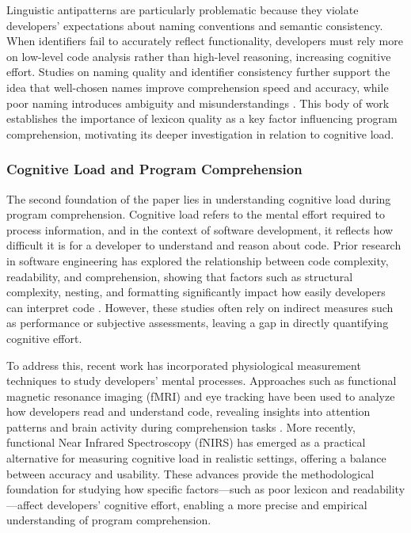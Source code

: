 Linguistic antipatterns are particularly problematic because they violate developers’ expectations about naming conventions and semantic consistency. When identifiers fail to accurately reflect functionality, developers must rely more on low-level code analysis rather than high-level reasoning, increasing cognitive effort. Studies on naming quality and identifier consistency further support the idea that well-chosen names improve comprehension speed and accuracy, while poor naming introduces ambiguity and misunderstandings \cite{Deissenboeck2006}. This body of work establishes the importance of lexicon quality as a key factor influencing program comprehension, motivating its deeper investigation in relation to cognitive load.

\subsubsection{Cognitive Load and Program Comprehension}

The second foundation of the paper lies in understanding cognitive load during program comprehension. Cognitive load refers to the mental effort required to process information, and in the context of software development, it reflects how difficult it is for a developer to understand and reason about code. Prior research in software engineering has explored the relationship between code complexity, readability, and comprehension, showing that factors such as structural complexity, nesting, and formatting significantly impact how easily developers can interpret code \cite{BuseWeimer2010}. However, these studies often rely on indirect measures such as performance or subjective assessments, leaving a gap in directly quantifying cognitive effort.

To address this, recent work has incorporated physiological measurement techniques to study developers' mental processes. Approaches such as functional magnetic resonance imaging (fMRI) and eye tracking have been used to analyze how developers read and understand code, revealing insights into attention patterns and brain activity during comprehension tasks \cite{Siegmund2014,Fritz2014}. More recently, functional Near Infrared Spectroscopy (fNIRS) has emerged as a practical alternative for measuring cognitive load in realistic settings, offering a balance between accuracy and usability. These advances provide the methodological foundation for studying how specific factors—such as poor lexicon and readability—affect developers' cognitive effort, enabling a more precise and empirical understanding of program comprehension.

